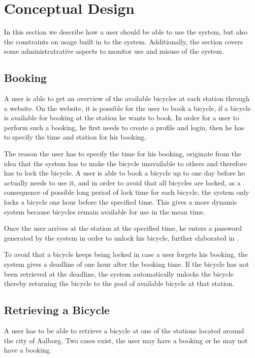 \section{Conceptual Design}
In this section we describe how a user should be able to use the system, but also the constraints on usage built in to the system.
Additionally, the section covers some administratrative aspects to monitor use and misuse of the system.

\subsection{Booking}
A user is able to get an overview of the available bicycles at each station through a website. 
On the website, it is possible for the user to book a bicycle, if a bicycle is available for booking at the station he wants to book. 
In order for a user to perform such a booking, he first needs to create a profile and login, then he has to specify the time and station for his booking.

The reason the user has to specify the time for his booking, originate from the idea that the system has to make the bicycle unavailable to others and therefore has to lock the bicycle.
A user is able to book a bicycle up to one day before he actually needs to use it, and in order to avoid that all bicycles are locked, as a consequence of possible long period of lock time for each bicycle, the system only locks a bicycle one hour before the specified time.
This gives a more dynamic system because bicycles remain available for use in the mean time.

Once the user arrives at the station at the specified time, he enters a password generated by the system in order to unlock his bicycle, further elaborated in .

To avoid that a bicycle keeps being locked in case a user forgets his booking, the system gives a deadline of one hour after the booking time.
If the bicycle has not been retrieved at the deadline, the system automatically unlocks the bicycle thereby returning the bicycle to the pool of available bicycle at that station. 

\subsection{Retrieving a Bicycle}\label{sec:conceptretrieveandshit}
A user has to be able to retrieve a bicycle at one of the stations located around the city of Aalborg.
Two cases exist, the user may have a booking or he may not have a booking.

